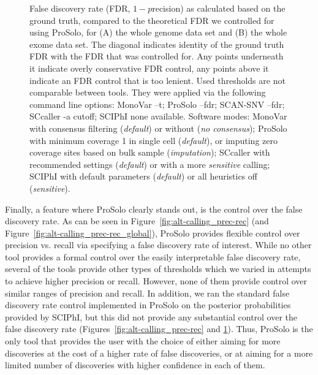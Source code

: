 \documentclass[authoryear,preprint,11pt]{scrartcl}
\begin{document}
\begin{figure}[!tpb]
\begin{minipage}[t]{.99\linewidth}
 \end{minipage}
 \caption{
 False discovery rate (FDR, $1 - p$recision) as calculated based on the ground truth, compared to the theoretical FDR we controlled for using ProSolo, for (A) the whole genome data set and (B) the whole exome data set.
 The diagonal indicates identity of the ground truth FDR with the FDR that was controlled for.
 Any points underneath it indicate overly conservative FDR control, any points above it indicate an FDR control that is too lenient.\newline \footnotesize
  Used thresholds are not comparable between tools.
  They were applied via the following command line options:
  MonoVar {\ttfamily --t};
  ProSolo {\ttfamily --fdr};
  SCAN-SNV {\ttfamily --fdr};
  SCcaller {\ttfamily -a cutoff};
  SCIPhI {\ttfamily none available}.
  Software modes:
  MonoVar with consensus filtering ({\itshape default}) or without ({\itshape no consensus});
  ProSolo with minimum coverage 1 in single cell ({\itshape default}), or imputing zero coverage sites based on bulk sample ({\itshape imputation});
  SCcaller with recommended settings ({\itshape default}) or with a more {\itshape sensitive} calling;
  SCIPhI with default parameters ({\itshape default}) or all heuristics off ({\itshape sensitive}).
 }
 \label{fig:FDR-ground-truth-vs-theoretical}
\end{figure}

Finally, a feature where ProSolo clearly stands out, is the control over the false discovery rate.
As can be seen in Figure~\ref{fig:alt-calling_prec-rec} (and Figure~\ref{fig:alt-calling_prec-rec_global}), ProSolo provides flexible control over precision vs. recall via specifying a false discovery rate of interest.
While no other tool provides a formal control over the easily interpretable false discovery rate, several of the tools provide other types of thresholds which we varied in attempts to achieve higher precision or recall.
However, none of them provide control over similar ranges of precision and recall.
In addition, we ran the standard false discovery rate control implemented in ProSolo on the posterior probabilities provided by SCIPhI, but this did not provide any substantial control over the false discovery rate (Figures~\ref{fig:alt-calling_prec-rec} and \ref{fig:FDR-ground-truth-vs-theoretical}).
Thus, ProSolo is the only tool that provides the user with the choice of either aiming for more discoveries at the cost of a higher rate of false discoveries, or at aiming for a more limited number of discoveries with higher confidence in each of them.
\end{document}
